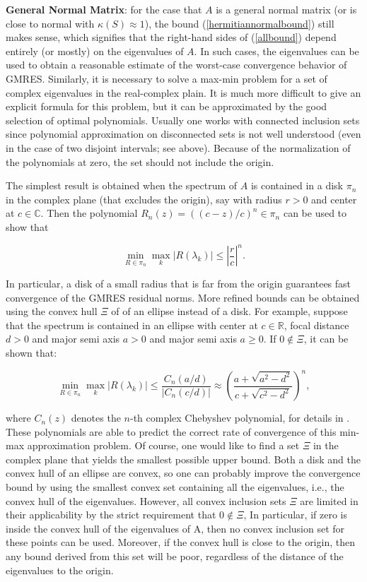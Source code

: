 {	\textbf{General Normal Matrix}: for the case that $A$ is a general normal matrix (or is close to normal with $\kappa(S) \approx 1$), the bound (\ref{hermitiannormalbound}) still makes sense, which signifies that the right-hand sides of (\ref{allbound}) depend entirely (or mostly) on the eigenvalues of $A$. In such cases, the eigenvalues can be used to obtain a reasonable estimate of the worst-case convergence behavior of GMRES. Similarly, it is necessary to solve a max-min problem for a set of complex eigenvalues in the real-complex plain. It is much more difficult to give an explicit formula for this problem, but it can be approximated by the good selection of optimal polynomials. Usually one works with connected inclusion sets since polynomial approximation on disconnected sets is not well understood (even in the case of two disjoint intervals; see above). Because of the normalization of the polynomials at zero, the set should not include the origin.
	
	The simplest result is obtained when the spectrum of $A$ is contained in a disk $\pi_n$ in the complex plane (that excludes the origin), say with radius $r > 0$ and center at $c \in \mathbb{C}$. Then the polynomial $R_n(z)=((c-z)/c)^n \in \pi_n$ can be used to show that
	
	\begin{equation}
	\min_{R \in \pi_n} \max_{k} |R(\lambda_k)| \leq |\frac{r}{c}|^n.
	\end{equation}
	
	In particular, a disk of a small radius that is far from the origin guarantees fast convergence of the GMRES residual norms. More refined bounds can be obtained using the convex hull  $\Xi$ of of an ellipse instead of a disk. For example, suppose that the spectrum is contained in an ellipse with center at $c \in \mathbb{R}$, focal distance $d > 0$ and major semi axis $a > 0$ and major semi axis $a \geq 0$. If $0 \notin \Xi$, it can be shown that:
	
	\begin{equation}
	\min_{R \in \pi_n} \max_{k} |R(\lambda_k)| \leq \frac{C_n(a/d)}{|C_n{(c/d)}|} \approx \left(\dfrac{a+\sqrt{a^2-d^2}}{c+\sqrt{c^2-d^2}}\right)^n,
	\end{equation}
	
	where $C_n(z)$ denotes the $n$-th complex Chebyshev polynomial, for details in \cite{saad2003iterative}. These polynomials are able to predict the correct rate of convergence of this min-max approximation problem. Of course, one would like to find a set $\Xi$ in the complex plane that yields the smallest possible upper bound. Both a disk and the convex hull of an ellipse are convex, so one can probably improve the convergence bound by using the smallest convex set containing all the eigenvalues, i.e., the convex hull of the eigenvalues. However, all convex inclusion sets $\Xi$ are limited in their applicability by the strict requirement that $0 \notin \Xi$, In particular, if zero is inside the convex hull of the eigenvalues of A, then no convex inclusion set for these points can be used. Moreover, if the convex hull is close to the origin, then any bound derived from this set will be poor, regardless of the distance of the eigenvalues to the origin.
	
}
